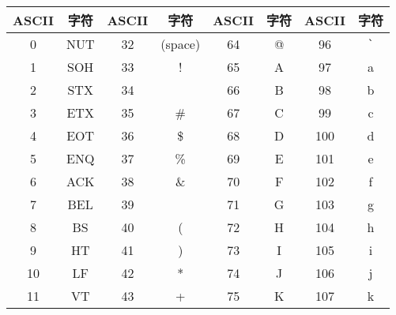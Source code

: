 \begin{longtable}{|c|c|c|c|c|c|c|c|}
	\hline
	\textbf{ASCII} & \textbf{字符} & \textbf{ASCII} & \textbf{字符} & \textbf{ASCII} & \textbf{字符}          & \textbf{ASCII} & \textbf{字符}          \\
	\hline
	0              & NUT           & 32             & (space)       & 64             & @                      & 96             & \lstinline|`| \\
	\hline
	1              & SOH           & 33             & !             & 65             & A                      & 97             & a                      \\
	\hline
	2              & STX           & 34             & \text{"}      & 66             & B                      & 98             & b                      \\
	\hline
	3              & ETX           & 35             & \#            & 67             & C                      & 99             & c                      \\
	\hline
	4              & EOT           & 36             & \$            & 68             & D                      & 100            & d                      \\
	\hline
	5              & ENQ           & 37             & \%            & 69             & E                      & 101            & e                      \\
	\hline
	6              & ACK           & 38             & \&            & 70             & F                      & 102            & f                      \\
	\hline
	7              & BEL           & 39             & \text{'}      & 71             & G                      & 103            & g                      \\
	\hline
	8              & BS            & 40             & (             & 72             & H                      & 104            & h                      \\
	\hline
	9              & HT            & 41             & )             & 73             & I                      & 105            & i                      \\
	\hline
	10             & LF            & 42             & *             & 74             & J                      & 106            & j                      \\
	\hline
	11             & VT            & 43             & +             & 75             & K                      & 107            & k                      \\

\end{longtable}

